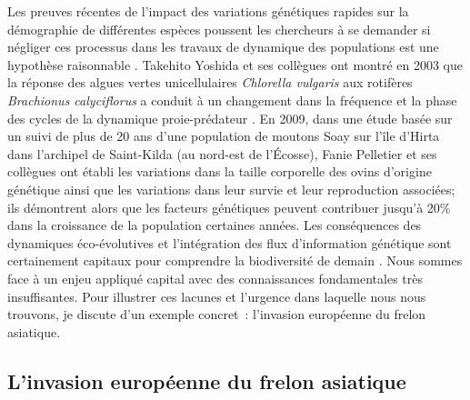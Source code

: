 Les preuves récentes de l'impact des variations génétiques rapides sur
la démographie de différentes espèces poussent les chercheurs à se
demander si négliger ces processus dans les travaux de dynamique des
populations est une hypothèse raisonnable
\citep{Pelletier2009, Post2009, Schoener2011}. Takehito Yoshida et ses
collègues ont montré en 2003 que la réponse des algues vertes
unicellulaires \emph{Chlorella vulgaris} aux rotifères \emph{Brachionus
calyciflorus} a conduit à un changement dans la fréquence et la phase
des cycles de la dynamique proie-prédateur \citep{Yoshida2003}. En 2009,
dans une étude basée sur un suivi de plus de 20 ans d'une population de
moutons Soay sur l'île d'Hirta dans l'archipel de Saint-Kilda (au
nord-est de l'Écosse), Fanie Pelletier et ses collègues ont établi les
variations dans la taille corporelle des ovins d'origine génétique ainsi
que les variations dans leur survie et leur reproduction associées; ils
démontrent alors que les facteurs génétiques peuvent contribuer jusqu'à
20\% dans la croissance de la population certaines années. Les
conséquences des dynamiques éco-évolutives et l'intégration des flux
d'information génétique sont certainement capitaux pour comprendre la
biodiversité de demain \citep{Sexton2009, Lavergne2010}. Nous sommes
face à un enjeu appliqué capital avec des connaissances fondamentales
très insuffisantes. Pour illustrer ces lacunes et l'urgence dans
laquelle nous nous trouvons, je discute d'un exemple concret~:
l'invasion européenne du frelon asiatique.

\subsection*{L'invasion européenne du frelon
asiatique}\label{linvasion-europuxe9enne-du-frelon-asiatique}

